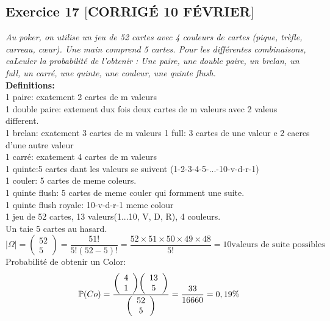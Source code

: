 \subsection*{Exercice 17 $[$CORRIGÉ 10 FÉVRIER$]$}
\textit{Au poker, on utilise un jeu de 52 cartes avec 4 couleurs de cartes (pique, trèfle, carreau, cœur). Une main comprend 5 cartes. Pour les différentes combinaisons, caLculer la probabilité de l’obtenir :
Une paire, une double paire, un brelan, un full, un carré, une quinte, une couleur, une quinte flush.}\\
\textbf{Definitions:}\\
1 paire: exatement 2 cartes de m valeurs\\
1 double paire: extement dux fois deux cartes de m valeurs avec 2 valeus different.\\
1 brelan: exatement 3 cartes de m valeurs
1 full: 3 cartes de une valeur e 2 caeres d'une autre valeur\\
1 carré:  exatement 4 cartes de m valeurs\\
1 quinte:5 cartes dant les valeurs se suivent (1-2-3-4-5-...-10-v-d-r-1)\\
1 couler: 5 cartes de meme coleurs. \\
1 quinte flush: 5 cartes de meme couler qui formment une suite.\\
1 quinte flush royale: 10-v-d-r-1 meme colour
\\
1 jeu de 52 cartes, 13 valeurs(1...10, V, D, R), 4 couleurs.\\
Un taie 5 cartes au hasard.\\
\begin{equation*}
    | \Omega |  = 
    {\left( \begin{array}{cc}52 \\ 5\end{array} \right)} =
    \frac{51!}{5!(52-5)!} = \frac{52 \times 51 \times 50 \times 49 \times 48}{5!} = 10 \text{valeurs de suite possibles}
\end{equation*}
Probabilité de obtenir un Color:\\
\begin{equation*}
    \mathbb{P}(Co) = \frac{{\left( \begin{array}{cc}4 \\ 1\end{array} \right)}{\left( \begin{array}{cc}13 \\ 5\end{array} \right)}}{{\left( \begin{array}{cc}52 \\ 5\end{array} \right)}} = \frac{33}{16660} = 0,19\%
\end{equation*}
